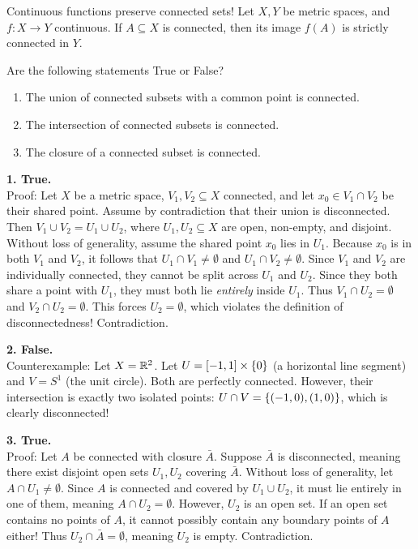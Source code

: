 \begin{theorem*}
Continuous functions preserve connected sets! Let $X, Y$ be metric spaces, and $f: X \to Y$ continuous. If $A \subseteq X$ is connected, then its image $f(A)$ is strictly connected in $Y$.
\end{theorem*}

\begin{exercise*}
Are the following statements True or False?
\begin{enumerate}
    \item The union of connected subsets with a common point is connected.
    \item The intersection of connected subsets is connected.
    \item The closure of a connected subset is connected.
\end{enumerate}
\end{exercise*}

\begin{solution}
\textbf{1. True.} \\
\textcolor{eSaddleBrown}{Proof:} Let $X$ be a metric space, $V_1, V_2 \subseteq X$ connected, and let $x_0 \in V_1 \cap V_2$ be their shared point. Assume by contradiction that their union is disconnected. Then $V_1 \cup V_2 = U_1 \cup U_2$, where $U_1, U_2 \subseteq X$ are open, non-empty, and disjoint. 
Without loss of generality, assume the shared point $x_0$ lies in $U_1$. Because $x_0$ is in both $V_1$ and $V_2$, it follows that $U_1 \cap V_1 \ne \emptyset$ and $U_1 \cap V_2 \ne \emptyset$. 
Since $V_1$ and $V_2$ are individually connected, they cannot be split across $U_1$ and $U_2$. Since they both share a point with $U_1$, they must both lie \emph{entirely} inside $U_1$. Thus $V_1 \cap U_2 = \emptyset$ and $V_2 \cap U_2 = \emptyset$. This forces $U_2 = \emptyset$, which violates the definition of disconnectedness! Contradiction.

\vspace{0.3cm}
\textbf{2. False.} \\
\textcolor{eSaddleBrown}{Counterexample:} Let $X = \mathbb{R}^2$. Let $U = [-1, 1] \times \left\{ 0 \right\}$ (a horizontal line segment) and $V = S^1$ (the unit circle). Both are perfectly connected. However, their intersection is exactly two isolated points: $U \cap V = \left\{ (-1,0), (1,0) \right\}$, which is clearly disconnected!

\vspace{0.3cm}
\textbf{3. True.} \\
\textcolor{eSaddleBrown}{Proof:} Let $A$ be connected with closure $\bar{A}$. Suppose $\bar{A}$ is disconnected, meaning there exist disjoint open sets $U_1, U_2$ covering $\bar{A}$. Without loss of generality, let $A \cap U_1 \ne \emptyset$. Since $A$ is connected and covered by $U_1 \cup U_2$, it must lie entirely in one of them, meaning $A \cap U_2 = \emptyset$. 
However, $U_2$ is an open set. If an open set contains no points of $A$, it cannot possibly contain any boundary points of $A$ either! Thus $U_2 \cap \bar{A} = \emptyset$, meaning $U_2$ is empty. Contradiction.
\end{solution}

